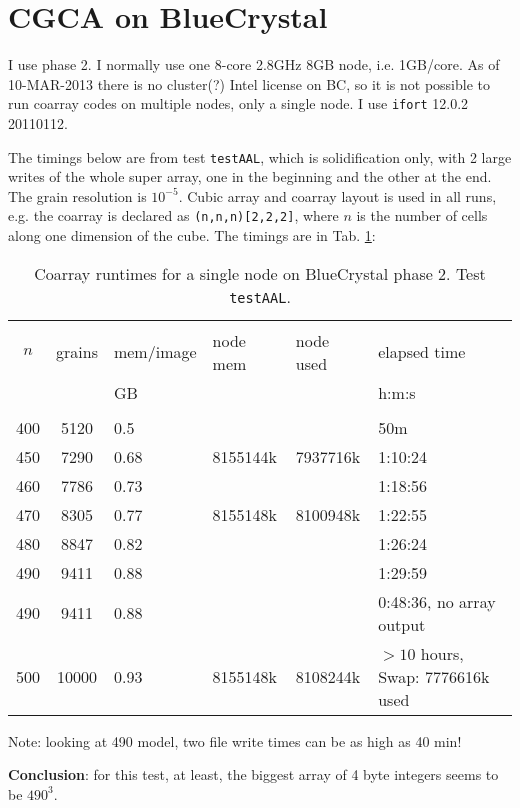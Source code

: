 \section{CGCA on BlueCrystal}

I use phase 2. I normally use one 8-core
2.8GHz 8GB node, i.e. 1GB/core.
As of 10-MAR-2013 there is no cluster(?)
Intel license on BC, so it is not possible
to run coarray codes on multiple nodes, only
a single node.
I use \texttt{ifort} 12.0.2 20110112.

The timings below are from test \texttt{testAAL},
which is solidification
only, with 2 large writes of the whole super
array, one in the beginning and the other at
the end.
The grain resolution is $10^{-5}$.
Cubic array and coarray layout is used in all
runs, e.g. the coarray is declared as
\texttt{(n,n,n)[2,2,2]}, where $n$ is the
number of cells along one dimension of the
cube.
The timings are in Tab. \ref{tab:bc:test:aal}:

\begin{table}[h]
\centering
\begin{tabular}{cclllp{8em}}
\hline
\\
$n$	&grains	& mem/image	&node mem	&node used	&elapsed time \\ 
	&	& GB		&		&		& h:m:s \\
\hline
\\
400	&5120	& 0.5	&		&		&50m \\
450	&7290	&0.68	&8155144k	&7937716k	&1:10:24 \\
460	&7786	&0.73	&		&		&1:18:56 \\
470     &8305   &0.77   &8155148k       &8100948k       &1:22:55 \\
480     &8847   &0.82   &               &               &1:26:24 \\
490     &9411   &0.88   &               &               &1:29:59 \\
490     &9411   &0.88   &               &               &0:48:36, no array output \\
500	&10000	&0.93   &8155148k       &8108244k       &$>10$ hours, Swap: 7776616k used \\
\hline
\end{tabular}
\caption{Coarray runtimes for a single node on BlueCrystal phase 2.
Test \texttt{testAAL}.}
\label{tab:bc:test:aal}
\end{table}

Note: looking at 490 model, two file write times
can be as high as 40 min!

 {\bf Conclusion}: for this test, at least, the biggest
array of 4 byte integers seems to be $490^3$.
